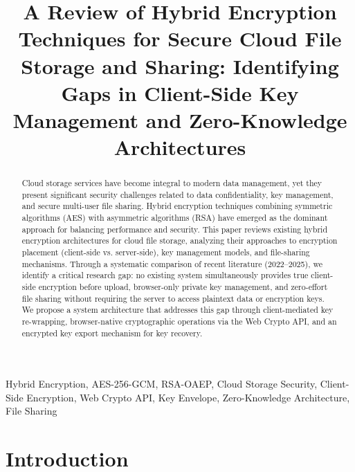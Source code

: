 \documentclass[conference]{IEEEtran}
\begin{document}
\title{A Review of Hybrid Encryption Techniques for Secure Cloud File Storage and Sharing: Identifying Gaps in Client-Side Key Management and Zero-Knowledge Architectures}

\author{
}

\maketitle

\begin{abstract}
Cloud storage services have become integral to modern data management, yet they present significant security challenges related to data confidentiality, key management, and secure multi-user file sharing. Hybrid encryption techniques combining symmetric algorithms (AES) with asymmetric algorithms (RSA) have emerged as the dominant approach for balancing performance and security. This paper reviews existing hybrid encryption architectures for cloud file storage, analyzing their approaches to encryption placement (client-side vs. server-side), key management models, and file-sharing mechanisms. Through a systematic comparison of recent literature (2022--2025), we identify a critical research gap: no existing system simultaneously provides true client-side encryption before upload, browser-only private key management, and zero-effort file sharing without requiring the server to access plaintext data or encryption keys. We propose a system architecture that addresses this gap through client-mediated key re-wrapping, browser-native cryptographic operations via the Web Crypto API, and an encrypted key export mechanism for key recovery.
\end{abstract}

\begin{IEEEkeywords}
Hybrid Encryption, AES-256-GCM, RSA-OAEP, Cloud Storage Security, Client-Side Encryption, Web Crypto API, Key Envelope, Zero-Knowledge Architecture, File Sharing
\end{IEEEkeywords}

\section{Introduction}
\end{document}
